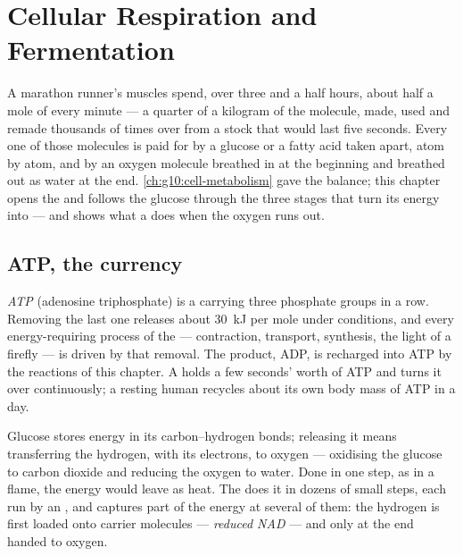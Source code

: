 \chapter{Cellular Respiration and Fermentation}\label{ch:g12:respiration-fermentation}

A marathon runner's muscles spend, over three and a half hours,
about half a mole of  every minute --- a quarter of a kilogram of
the molecule, made, used and remade thousands of times over from a
stock that would last five seconds. Every one of those  molecules is paid
for by a glucose or a fatty acid taken apart, atom by atom, and by an
oxygen molecule breathed in at the beginning and breathed out as water
at the end. \cref{ch:g10:cell-metabolism} gave the balance; this
chapter opens the  and follows the glucose through the
three stages that turn its energy into  --- and shows what a 
does when the oxygen runs out.

\section{ATP, the currency}

\begin{definition}[ATP]\label{def:g12:respiration-fermentation:atp}
\emph{ATP} (adenosine triphosphate) is a 
carrying three phosphate groups in a row. Removing the last one
releases about \qty{30}{kJ} per mole under  conditions, and every
energy-requiring process of the  --- contraction, transport,
synthesis, the light of a firefly --- is driven by that removal.
The product, ADP, is recharged into ATP by the reactions of this
chapter. A  holds a few seconds' worth of ATP and turns it over
continuously; a resting human recycles about its own body mass of ATP
in a day.
\end{definition}

\begin{proposition}\label{prop:g12:respiration-fermentation:oxidation}
Glucose stores energy in its carbon--hydrogen bonds; releasing it
means transferring the hydrogen, with its electrons, to oxygen ---
oxidising the glucose to carbon dioxide and reducing the oxygen to
water. Done in one step, as in a flame, the energy would leave as
heat. The  does it in dozens of small steps, each run by an
, and captures part of the energy at several of them: the
hydrogen is first loaded onto carrier molecules --- \emph{reduced
NAD} --- and only at the end handed to oxygen.
\end{proposition}
\admitted

